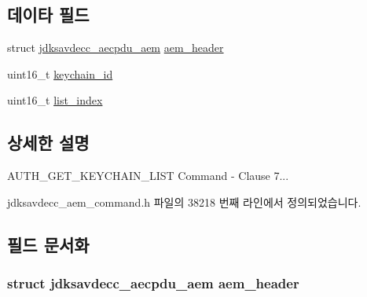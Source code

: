 \subsection*{데이타 필드}
\begin{DoxyCompactItemize}
\item 
struct \hyperlink{structjdksavdecc__aecpdu__aem}{jdksavdecc\+\_\+aecpdu\+\_\+aem} \hyperlink{structjdksavdecc__aem__command__auth__get__keychain__list_ae1e77ccb75ff5021ad923221eab38294}{aem\+\_\+header}
\item 
uint16\+\_\+t \hyperlink{structjdksavdecc__aem__command__auth__get__keychain__list_a10ed6547e01665c453e2a40b142f7526}{keychain\+\_\+id}
\item 
uint16\+\_\+t \hyperlink{structjdksavdecc__aem__command__auth__get__keychain__list_a2860632dbc7912d3e434203be8f2d9da}{list\+\_\+index}
\end{DoxyCompactItemize}


\subsection{상세한 설명}
A\+U\+T\+H\+\_\+\+G\+E\+T\+\_\+\+K\+E\+Y\+C\+H\+A\+I\+N\+\_\+\+L\+I\+ST Command -\/ Clause 7... 

jdksavdecc\+\_\+aem\+\_\+command.\+h 파일의 38218 번째 라인에서 정의되었습니다.



\subsection{필드 문서화}
\subsubsection[{\texorpdfstring{aem\+\_\+header}{aem_header}}]{\setlength{\rightskip}{0pt plus 5cm}struct {\bf jdksavdecc\+\_\+aecpdu\+\_\+aem} aem\+\_\+header}\hypertarget{structjdksavdecc__aem__command__auth__get__keychain__list_ae1e77ccb75ff5021ad923221eab38294}{}\label{structjdksavdecc__aem__command__auth__get__keychain__list_ae1e77ccb75ff5021ad923221eab38294}


